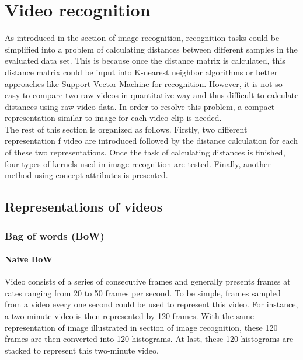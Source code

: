 \section {Video recognition}
As introduced in the section of image recognition, recognition tasks could be simplified into a problem of calculating distances between different samples in the evaluated data set. This is because once the distance matrix is calculated, this distance matrix could be input into K-nearest neighbor algorithms or better approaches like Support Vector Machine for recognition. However, it is not so easy to compare two raw videos in quantitative way and thus difficult to calculate distances using raw video data. In order to resolve this problem, a compact representation similar to image for each video clip is needed. \\

\noindent The rest of this section is organized as follows. Firstly, two different representation f video are introduced followed by the distance calculation for each of these two representations. Once the task of calculating distances is finished, four types of kernels used in image recognition are tested. Finally, another method using concept attributes is presented. 

\subsection{Representations of videos}
	\subsubsection{Bag of words (BoW)}
	\paragraph{Naive BoW}
	Video consists of a series of consecutive frames and generally presents frames at rates ranging from 20 to 50 frames per second. To be simple, frames sampled from a video every one second could be used to represent this video. For instance, a two-minute video is then represented by 120 frames. With the same representation of image illustrated in section of image recognition, these 120 frames are then converted into 120 histograms. At last, these 120 histograms are stacked to represent this two-minute video. \\

